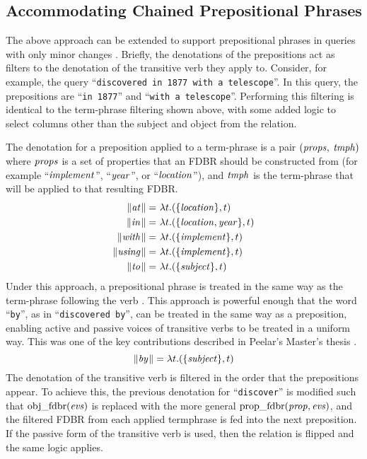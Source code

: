 \documentclass[../main.tex]{subfiles}
\begin{document}
\begin{refsection}
\subsection{Accommodating Chained Prepositional Phrases}

The above approach can be extended to support prepositional phrases in queries with only minor changes \cite{peelar2016accommodating, frost2013event}. Briefly, the denotations of the prepositions act as filters to the denotation of the transitive verb they apply to.  Consider, for example, the query ``\texttt{discovered in 1877 with a telescope}''.  In this query, the prepositions are ``\texttt{in 1877}'' and ``\texttt{with a telescope}''.  Performing this filtering is identical to the term-phrase filtering shown above, with some added logic to select columns other than the subject and object from the relation.

The denotation for a preposition applied to a term-phrase is a pair  $(\operatorname{\mathit{props}},$ $\operatorname{\mathit{tmph}})$ where $\operatorname{\mathit{props}}$ is a set of properties that an FDBR should be constructed from (for example ``$\operatorname{\mathit{implement}}$'', ``$\operatorname{\mathit{year}}$'', or ``$\operatorname{\mathit{location}}$''), and $\operatorname{\mathit{tmph}}$ is the term-phrase that will be applied to that resulting FDBR.
\begin{equation*}
	\begin{split}
		\lVert\textit{at\hspace{0.1em}}\rVert =&\ \lambda t.(\{\operatorname{\mathit{location}}\}, t) \\
		\lVert\textit{in\hspace{0.1em}}\rVert =&\ \lambda t.(\{{\operatorname{\mathit{location}}}, {\operatorname{\mathit{year}}}\}, t) \\
		\lVert\textit{with\hspace{0.1em}}\rVert =&\ \lambda t.(\{\operatorname{\mathit{implement}}\}, t) \\
		\lVert\textit{using\hspace{0.1em}}\rVert =&\ \lambda t.(\{\operatorname{\mathit{implement}}\}, t) \\
		\lVert\textit{to\hspace{0.1em}}\rVert =&\ \lambda t.(\{\operatorname{\mathit{subject}}\}, t)
	\end{split}
\end{equation*}
Under this approach, a prepositional phrase is treated in the same way as the term-phrase following the verb \cite{peelar2016accommodating}.
This approach is powerful enough that the word ``\texttt{by}'', as in ``\texttt{discovered by}'', can be treated in the same way as a preposition, enabling active and passive voices of transitive verbs to be treated in a uniform way.  This was one of the key contributions described in Peelar's Master's thesis \cite{peelar2016accommodating}.
\[
\lVert\textit{by\hspace{0.1em}}\rVert = \lambda t.(\{\operatorname{\mathit{subject}}\}, t)
\]
The denotation of the transitive verb is filtered in the order that the prepositions appear.  To achieve this, the previous denotation for ``\texttt{discover}'' is modified such that $\operatorname{obj\_fdbr}({\operatorname{\mathit{evs}}})$ is replaced with the more general $\operatorname{prop\_fdbr}({\operatorname{\mathit{prop}}}, {\operatorname{\mathit{evs}}})$, and the filtered FDBR from each applied termphrase is fed into the next preposition.  If the passive form of the transitive verb is used, then the relation is flipped and the same logic applies.


\end{refsection}
\end{document}

